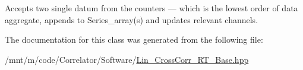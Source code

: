 Accepts two single {\ttfamily datum} from the counters — which is the lowest order of data aggregate, appends to Series\+\_\+array(s) and updates relevant channels. 



The documentation for this class was generated from the following file\+:\begin{DoxyCompactItemize}
\item 
/mnt/m/code/\+Correlator/\+Software/\hyperlink{Lin__CrossCorr__RT__Base_8hpp}{Lin\+\_\+\+Cross\+Corr\+\_\+\+R\+T\+\_\+\+Base.\+hpp}\end{DoxyCompactItemize}
